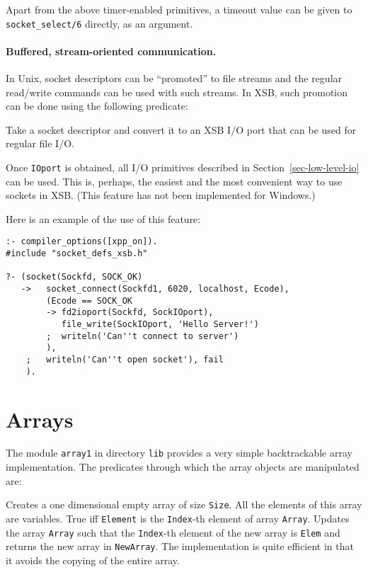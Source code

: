 \noindent
Apart from the above timer-enabled primitives, a timeout value can be given
to {\tt socket\_select/6} directly, as an argument.


\paragraph{Buffered, stream-oriented communication.}
In Unix, socket descriptors can be ``promoted'' to file streams and the
regular read/write commands can be used with such streams. In XSB, such
promotion can be done using the following predicate:
\begin{description}
    Take a socket descriptor and convert it to an XSB I/O port that can be used
    for regular file I/O. 
\end{description}
Once {\tt IOport} is obtained, all I/O primitives described in
Section~\ref{sec-low-level-io} can be used. This is, perhaps, the easiest
and the most convenient way to use sockets in XSB. (This feature has not
been implemented for Windows.)

\noindent
Here is an example of the use of this feature:
\begin{samepage}
\begin{verbatim}
:- compiler_options([xpp_on]).
#include "socket_defs_xsb.h"

?- (socket(Sockfd, SOCK_OK)
   ->   socket_connect(Sockfd1, 6020, localhost, Ecode),
        (Ecode == SOCK_OK
        -> fd2ioport(Sockfd, SockIOport),
           file_write(SockIOport, 'Hello Server!')
        ;  writeln('Can''t connect to server')
        ),
    ;   writeln('Can''t open socket'), fail
    ).
\end{verbatim}
\end{samepage}


\section{Arrays}

The module {\tt array1} in directory {\tt lib} provides a very simple 
backtrackable array implementation.  The predicates through which the 
array objects are manipulated are:

\begin{description}
    Creates a one dimensional empty array of size {\tt Size}.  All the 
    elements of this array are variables.
    True iff {\tt Element} is the {\tt Index}-th element of array 
    {\tt Array}.
    Updates the array {\tt Array} such that the {\tt Index}-th element
    of the new array is {\tt Elem} and returns the new array in 
    {\tt NewArray}.  The implementation is quite efficient in that it 
    avoids the copying of the entire array.
\end{description}

